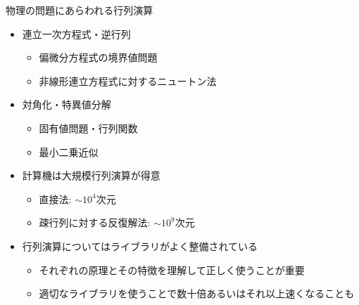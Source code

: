 \begin{frame}[t,fragile]{物理の問題にあらわれる行列演算}
  \begin{itemize}
  \item 連立一次方程式・逆行列
    \begin{itemize}
    \item 偏微分方程式の境界値問題
    \item 非線形連立方程式に対するニュートン法
    \end{itemize}
  \item 対角化・特異値分解
    \begin{itemize}
    \item 固有値問題・行列関数
    \item 最小二乗近似
    \end{itemize}
  \item 計算機は大規模行列演算が得意
    \begin{itemize}
    \item 直接法: $\sim10^4$次元
    \item 疎行列に対する反復解法: $\sim10^{9}$次元
    \end{itemize}
  \item 行列演算についてはライブラリがよく整備されている
    \begin{itemize}
    \item それぞれの原理とその特徴を理解して正しく使うことが重要
    \item 適切なライブラリを使うことで数十倍あるいはそれ以上速くなることも
    \end{itemize}
  \end{itemize}
\end{frame}
